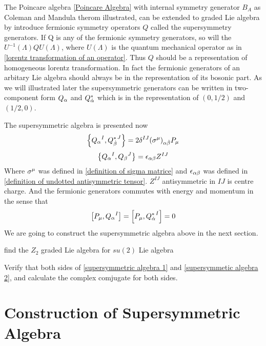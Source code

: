     The Poincare algebra \eqref{Poincare Algebra} with internal symmetry generator $B_A$ as Coleman and Mandula therom illustrated, can be extended to graded Lie algebra by introduce fermionic symmetry operators $Q$ called the supersymmetry generators. If Q is any of the fermionic symmetry generators, so will the $U^{-1}(\Lambda) Q U(\Lambda)$, where $U(\Lambda)$ is the quantum mechanical operator as in \eqref{lorentz transformation of an operator}. Thus $Q$ should be a representation of homogeneous lorentz transformation.
    In fact the fermionic generators of an arbitary Lie algebra should always be in the representation of its bosonic part. As we will illustrated later the supersymmetric generators can be written in two-component form $Q_\alpha$ and $Q^{*}_{\dot{\alpha}}$ which is in the representation of $(0,1/2)$ and $(1/2,0)$.  
    
    The supersymmetric algebra is presented now
    \begin{equation}\label{supersymmetric algebra 1}
     \acomm{\uQ{\a}{I}}{\lQ{\dob}{J}}
     = 2 \de^{IJ} (\s^{\m})_{\a\dob}P_{\m}
    \end{equation}
    \begin{equation}\label{supersymmetic algebra 2}
    \acomm{\uQ{\a}{I}}{\uQ{\be}{J}}
    = \e_{\a\be}Z^{IJ}
    \end{equation}
    Where $\sigma^{\mu}$ was defined in \eqref{definition of sigma matrice} and $\epsilon_{\alpha\beta}$ was defined in \eqref{definition of undotted antisymmetric tensor}. $Z^{IJ}$ antisymmetric in $IJ$ is centre charge. And the fermionic generators commutes with energy and momentum in the sense that 
    \begin{equation}
    \comm{P_\m}{\uQ{\a}{I}} = 
    \comm{P_\m}{\lQ{\doa}{I}} = 0
    \end{equation} 
    We are going to construct the supersymmetric algebra above in the next section.
    
    \begin{Exe}
    	find the $Z_2$ graded Lie algebra for $su(2)$ Lie algebra
    \end{Exe}
    
    \begin{Exe}
        Verify that both sides of \eqref{supersymmetric algebra 1} and \eqref{supersymmetic algebra 2}, and calculate the complex comjugate for both sides.
    \end{Exe}
    
    \section{Construction of Supersymmetric Algebra} 